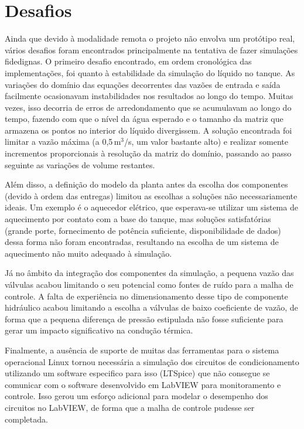 \section{Desafios}

Ainda que devido à modalidade remota o projeto não envolva um protótipo real, vários desafios foram encontrados principalmente na tentativa de fazer simulações fidedignas. O primeiro desafio encontrado, em ordem cronológica das implementações, foi quanto à estabilidade da simulação do líquido no tanque. As variações do domínio das equações decorrentes das vazões de entrada e saída facilmente ocasionavam instabilidades nos resultados ao longo do tempo. Muitas vezes, isso decorria de erros de arredondamento que se acumulavam ao longo do tempo, fazendo com que o nível da água esperado e o tamanho da matriz que armazena os pontos no interior do líquido divergissem. A solução encontrada foi limitar a vazão máxima (a 0,5\,m$^3$/s, um valor bastante alto) e realizar somente incrementos proporcionais à resolução da matriz do domínio, passando ao passo seguinte as variações de volume restantes.

Além disso, a definição do modelo da planta antes da escolha dos componentes (devido à ordem das entregas) limitou as escolhas a soluções não necessariamente ideais. Um exemplo é o aquecedor elétrico, que esperava-se utilizar um sistema de aquecimento por contato com a base do tanque, mas soluções satisfatórias (grande porte, fornecimento de potência suficiente, disponibilidade de dados) dessa forma não foram encontradas, resultando na escolha de um sistema de aquecimento não muito adequado à simulação.

Já no âmbito da integração dos componentes da simulação, a pequena vazão das válvulas acabou limitando o seu potencial como fontes de ruído para a malha de controle. A falta de experiência no dimensionamento desse tipo de componente hidráulico acabou limitando a escolha a válvulas de baixo coeficiente de vazão, de forma que a pequena diferença de pressão estipulada não fosse suficiente para gerar um impacto significativo na condução térmica.

Finalmente, a ausência de suporte de muitas das ferramentas para o sistema operacional Linux tornou necessária a simulação dos circuitos de condicionamento utilizando um software especifico para isso (LTSpice) que não consegue se comunicar com o software desenvolvido em LabVIEW para monitoramento e controle. Isso gerou um esforço adicional para modelar o desempenho dos circuitos no LabVIEW, de forma que a malha de controle pudesse ser completada.

